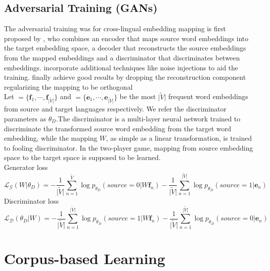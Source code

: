 \subsection{Adversarial Training (GANs)}
The adversarial training was for cross-lingual embedding mapping is first proposed by \cite{barone2016towards}, who combines an encoder that maps source word embeddings into the target embedding space, a decoder that reconstructs the source embeddings from the mapped embeddings and a discriminator that discriminates between embeddings. \cite{zhang2017adversarial} incorporate additional techniques like noise injections to aid the training. \cite{DBLP:journals/corr/abs-1710-04087} finally achieve good results by dropping the reconstruction component regularizing the mapping to be orthogonal\\
Let ${=\{ \bm{f}_1, \cdots, \bm{f}_{{\lvert \tilde{V} \rvert}}\}}$ and ${ = \{ \bm{e}_1, \cdots , \bm{e}_{{\lvert \tilde{V} \rvert}}\}}$ be the most ${\lvert \tilde{V} \rvert}$ frequent word embeddings from source and target languages respectively. We refer the discriminator parameters as ${\theta_D}$.The discriminator is a multi-layer neural network trained to discriminate the transformed source word embedding from the target word embedding, while the mapping $W$, as simple as a linear transformation, is trained to fooling discriminator. In the two-player game, mapping from source embedding space to the target space is supposed to be learned.\\

Generator loss 
\[ \mathcal{L_G}(W|\theta_D) =  -\frac{1}{{\lvert \tilde{V} \rvert}} \sum_{n=1}^{\tilde{V}}\log p_{\theta_D}(source=0|W \bm{f}_n) - \frac{1}{{\lvert \tilde{V} \rvert}} \sum_{n=1}^{{\lvert \tilde{V} \rvert}} \log p_{\theta_D}(source = 1 | \bm{e}_n) \]
Discriminator loss
\[ \mathcal{L_D}(\theta_D | W) =  -\frac{1}{{\lvert \tilde{V} \rvert}} \sum_{n=1}^{{\lvert \tilde{V} \rvert}} \log p_{\theta_D}(source = 1| W\bm{f}_n) - \frac{1}{{\lvert \tilde{V} \rvert}} \sum_{n=1}^{{\lvert \tilde{V} \rvert}} \log p_{\theta_D}(source=0| \bm{e}_n) \]	 
\section{Corpus-based Learning}
